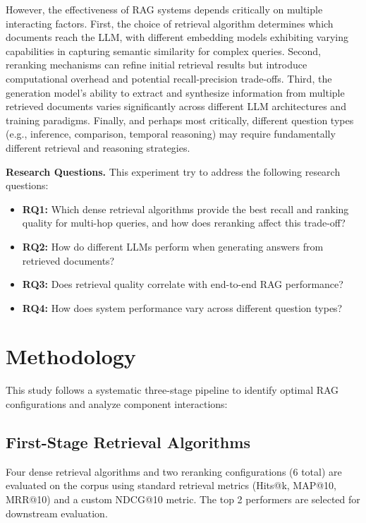 \documentclass[10pt,twocolumn]{article}
\begin{document}
However, the effectiveness of RAG systems depends critically on multiple interacting factors. First, the choice of retrieval algorithm determines which documents reach the LLM, with different embedding models exhibiting varying capabilities in capturing semantic similarity for complex queries. Second, reranking mechanisms can refine initial retrieval results but introduce computational overhead and potential recall-precision trade-offs. Third, the generation model's ability to extract and synthesize information from multiple retrieved documents varies significantly across different LLM architectures and training paradigms. Finally, and perhaps most critically, different question types (e.g., inference, comparison, temporal reasoning) may require fundamentally different retrieval and reasoning strategies.

\textbf{Research Questions.} This experiment try to address the following research questions:

\begin{itemize}[leftmargin=*, itemsep=0pt]
    \item \textbf{RQ1:} Which dense retrieval algorithms provide the best recall and ranking quality for multi-hop queries, and how does reranking affect this trade-off?
    \item \textbf{RQ2:} How do different LLMs perform when generating answers from retrieved documents?
    \item \textbf{RQ3:} Does retrieval quality correlate with end-to-end RAG performance?
    \item \textbf{RQ4:} How does system performance vary across different question types?
\end{itemize}

\section{Methodology}

This study follows a systematic three-stage pipeline to identify optimal RAG configurations and analyze component interactions:

\subsection{First-Stage Retrieval Algorithms}

Four dense retrieval algorithms and two reranking configurations (6 total) are evaluated on the corpus using standard retrieval metrics (Hits@k, MAP@10, MRR@10) and a custom NDCG@10 metric. The top 2 performers are selected for downstream evaluation.
\end{document}
